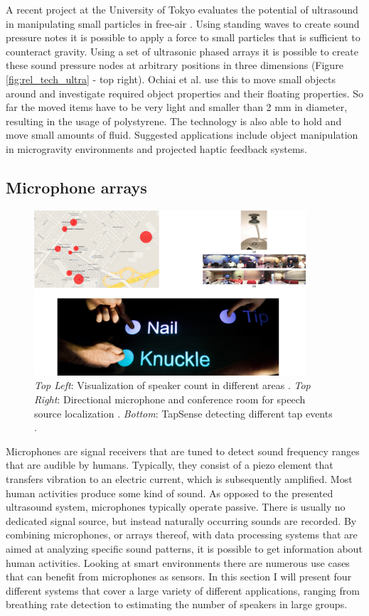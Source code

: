 A recent project at the University of Tokyo evaluates the potential of ultrasound in manipulating small particles in free-air \cite{ochiai2013three}. Using standing waves to  create sound pressure notes it is possible to apply a force to small particles that is sufficient to counteract gravity. Using a set of ultrasonic phased arrays it is possible to create these sound pressure nodes at arbitrary positions in three dimensions (Figure \ref{fig:rel_tech_ultra} - top right). Ochiai et al. use this to move small objects around and investigate required object properties and their floating properties. So far the moved items have to be very light and smaller than 2 mm in diameter, resulting in the usage of polystyrene. The technology is also able to hold and move small amounts of fluid. Suggested applications include object manipulation in microgravity environments and projected haptic feedback systems.

\subsection{Microphone arrays}
\begin{figure}[h]
\centering
\includegraphics[width=0.9\textwidth]{images/rel_tech_mic}
\caption{\emph{Top Left}: Visualization of speaker count in different areas \cite{xu2013crowd++}. \emph{Top Right}: Directional microphone and conference room for speech source localization \cite{zhang2008maximum}. \emph{Bottom}: TapSense detecting different tap events \cite{harrison2011tapsense}.}
\label{fig:rel_tech_mic}
\end{figure}
Microphones are signal receivers that are tuned to detect sound frequency ranges that are audible by humans. Typically, they consist of a piezo element that transfers vibration to an electric current, which is subsequently amplified. Most human activities produce some kind of sound. As opposed to the presented ultrasound system, microphones typically operate passive. There is usually no dedicated signal source, but instead naturally occurring sounds are recorded. By combining microphones, or arrays thereof, with data processing systems that are aimed at analyzing specific sound patterns, it is possible to get information about human activities. Looking at smart environments there are numerous use cases that can benefit from microphones as sensors. In this section I will present four different systems that cover a large variety of different applications, ranging from breathing rate detection to estimating the number of speakers in large groups.

